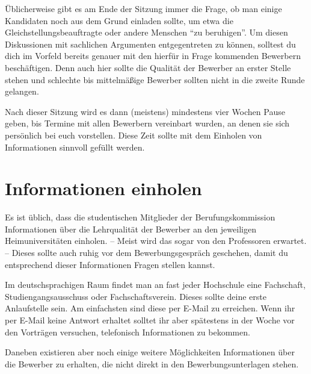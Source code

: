 \documentclass[10pt,twoside,a5paper,openright]{book}
\begin{document}
Üblicherweise gibt es am Ende der Sitzung immer die Frage, ob man einige Kandidaten noch aus dem Grund einladen sollte, um etwa die Gleichstellungsbeauftragte oder andere Menschen "`zu beruhigen"'. Um diesen Diskussionen mit sachlichen Argumenten entgegentreten zu können, solltest du dich im Vorfeld bereits genauer mit den hierfür in Frage kommenden Bewerbern beschäftigen. Denn auch hier sollte die Qualität der Bewerber an erster Stelle stehen und schlechte bis mittelmäßige Bewerber sollten nicht in die zweite Runde gelangen.

Nach dieser Sitzung wird es dann (meistens) mindestens vier Wochen Pause geben, bis Termine mit allen Bewerbern vereinbart wurden, an denen sie sich persönlich bei euch vorstellen. Diese Zeit sollte mit dem Einholen von Informationen sinnvoll gefüllt werden.

\section{Informationen einholen}
Es ist üblich, dass die studentischen Mitglieder der Berufungskommission Informationen über die Lehrqualität der Bewerber an den jeweiligen Heimuniversitäten einholen. -- Meist wird das sogar von den Professoren erwartet. -- Dieses sollte auch ruhig vor dem Bewerbungsgespräch geschehen, damit du entsprechend dieser Informationen Fragen stellen kannst.

Im deutschsprachigen Raum findet man an fast jeder Hochschule eine Fachschaft, Studiengangsausschuss oder Fachschaftsverein. Dieses sollte deine erste Anlaufstelle sein. Am einfachsten sind diese per E-Mail zu erreichen.  Wenn ihr per E-Mail keine Antwort erhaltet solltet ihr aber spätestens in der Woche vor den Vorträgen versuchen, telefonisch Informationen zu bekommen.

Daneben existieren aber noch einige weitere Möglichkeiten Informationen über die Bewerber zu erhalten, die nicht direkt in den Bewerbungsunterlagen stehen.
\end{document}
